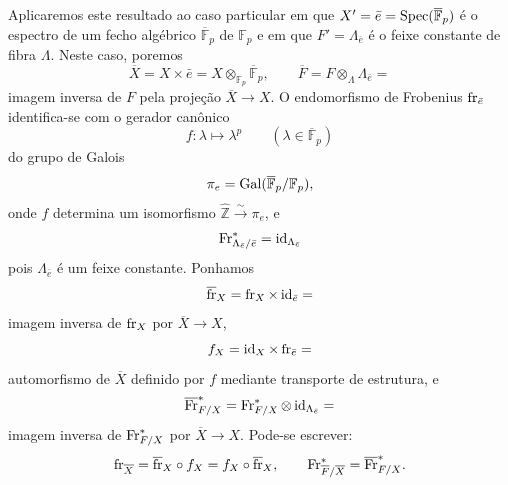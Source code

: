 Aplicaremos este resultado ao caso particular em que $X'=\bar e=\operatorname{Spec}(\overline{\mathbb F}_p)$ é o espectro de um fecho algébrico $\overline{\mathbb F}_p$ de $\mathbb F_p$ e em que $F'=\Lambda_{\bar e}$ é o feixe constante de fibra $\Lambda$. Neste caso, poremos
\[
\overline X=X\times\bar e=X\otimes_{\mathbb F_p}\overline{\mathbb F}_p,
\qquad
\overline F=F\otimes_\Lambda\Lambda_{\bar e}=
\]
imagem inversa de $F$ pela projeção $\overline X\to X$. O endomorfismo de Frobenius $\operatorname{fr}_{\bar e}$ identifica-se com o gerador canônico
\[
f:\lambda\longmapsto\lambda^p\qquad(\lambda\in\overline{\mathbb F}_p)
\]
do grupo de Galois
\[
\pi_e=\operatorname{Gal}(\overline{\mathbb F}_p/\mathbb F_p),
\]
onde $f$ determina um isomorfismo $\widehat{\mathbb Z}\xrightarrow{\sim}\pi_e$, e
\[
\operatorname{Fr}^*_{\Lambda_{\bar e}/\bar e}=\operatorname{id}_{\Lambda_{\bar e}}
\]
pois $\Lambda_{\bar e}$ é um feixe constante. Ponhamos
\[
\overline{\operatorname{fr}}_X=\operatorname{fr}_X\times\operatorname{id}_{\bar e}=
\]
imagem inversa de $\operatorname{fr}_X$ por $\overline X\to X$,
\[
f_X=\operatorname{id}_X\times\operatorname{fr}_{\bar e}=
\]
automorfismo de $\overline X$ definido por $f$ mediante transporte de estrutura, e
\[
\overline{\operatorname{Fr}}^*_{F/X}=\operatorname{Fr}^*_{F/X}\otimes\operatorname{id}_{\Lambda_{\bar e}}=
\]
imagem inversa de $\operatorname{Fr}^*_{F/X}$ por $\overline X\to X$. Pode-se escrever:
\[
\operatorname{fr}_{\overline X}=\overline{\operatorname{fr}}_X\circ f_X=f_X\circ\overline{\operatorname{fr}}_X,
\qquad
\operatorname{Fr}^*_{\overline F/\overline X}=\overline{\operatorname{Fr}}^*_{F/X}.
\]
